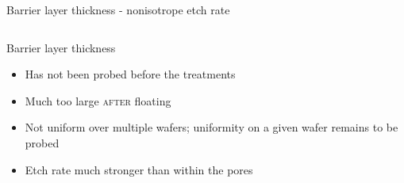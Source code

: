\documentclass[../defence.tex]{subfiles}
\begin{document}
\begin{frame}{Barrier layer thickness - nonisotrope etch rate}
\begin{columns}[onlytextwidth, T]
\begin{alertbox}{Barrier layer thickness}
\begin{tiny}
\begin{itemize}
            \item Has not been probed before the treatments
            \pause

            \item Much too large \textsc{after} floating
            \pause

            \item Not uniform over multiple wafers; uniformity on a given wafer remains to be probed
            \pause

            \item Etch rate much stronger than within the pores
          \end{itemize}
        \end{tiny}
      \end{alertbox}
    \end{columns}
  \end{frame}
\end{document}
